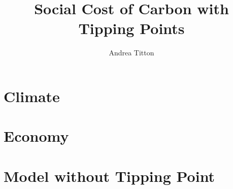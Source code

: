 \documentclass[american, abstract=on]{scrartcl}
\author{Andrea Titton}
\title{Social Cost of Carbon with Tipping Points}
\begin{document}
\maketitle
\section{Climate}



\section{Economy}



\section{Model without Tipping Point}



\nocite{*}
\newpage
\printbibliography
\end{document}
